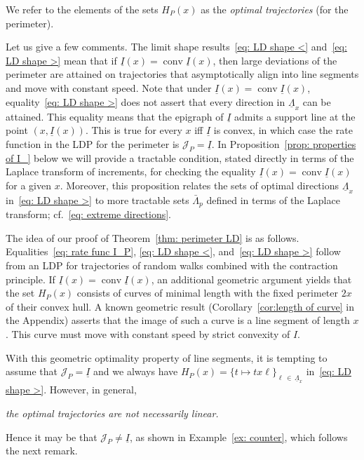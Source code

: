 \documentclass[AHL,Unicode,published]{cedram}
\DeclareMathOperator{\conv}{conv}
\newcommand{\ubar}[1]{\underline{#1}}
\newcommand{\Jcl}{\mathcal{J}}
\begin{document}
We refer to the elements of the sets $H_P(x)$ as the \emph{optimal trajectories} (for the perimeter).

Let us give a few comments. The limit shape results~\eqref{eq: LD shape <} and~\eqref{eq: LD shape >} mean that if $\ubar I(x) = \conv \ubar I(x)$, then large deviations of the perimeter are attained on trajectories that asymptotically align into line segments and move with constant speed. Note that under $\ubar I(x) = \conv \ubar I(x)$, equality~\eqref{eq: LD shape >} does not assert that every direction in $\ubar{\Lambda}_x$ can be attained. This equality means that the epigraph of $\ubar I$ admits a support line at the point $(x, \ubar I(x))$. This is true for every $x$ iff $\ubar I$ is convex, in which case the rate function in the LDP for the perimeter is $\Jcl_P = \ubar I$. In Proposition~\ref{prop: properties of I_} below we will provide a tractable condition, stated directly in terms of the Laplace transform of increments, for checking the equality $\ubar I(x)= \conv \ubar I(x)$ for a given $x$. Moreover, this proposition relates the sets of optimal directions $\ubar{\Lambda}_x$ in~\eqref{eq: LD shape >} to more tractable sets $\bar \Lambda_p$ defined in terms of the Laplace transform; cf.~\eqref{eq: extreme directions}.

The idea of our proof of Theorem~\ref{thm: perimeter LD} is as follows. Equalities~\eqref{eq: rate func I_P}, \eqref{eq: LD shape <}, and~\eqref{eq: LD shape >} follow from an LDP for trajectories of random walks combined with the contraction principle. If $\ubar I(x) = \conv \ubar I(x)$, an additional geometric argument yields that the set $H_P(x)$ consists of curves of minimal length with the fixed perimeter $2x$ of their convex hull. A known geometric result (Corollary~\ref{cor:length of curve} in the Appendix) asserts that the image of such a curve is a line segment of length $x$. This curve must move with constant speed by strict convexity of $I$.

With this geometric optimality property of line segments, it is tempting to assume that $\Jcl_P = \ubar I$ and we always have $H_P(x)=\{t \mapsto t x \ell\}_{\ell\,\in\, \ubar\Lambda_x}$ in~\eqref{eq: LD shape >}. However, in general,
\begin{center}
\emph{the optimal trajectories are not necessarily linear.}
\end{center}
Hence it may be that $\Jcl_P \neq \ubar I$, as shown in Example~\ref{ex: counter}, which follows the next remark.
\end{document}
